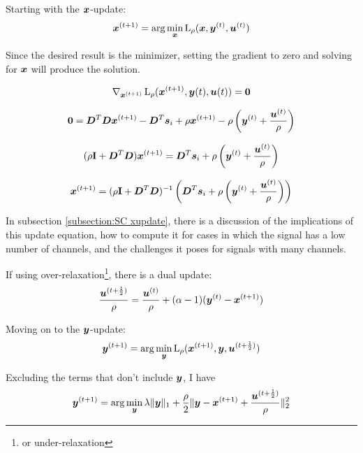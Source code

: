 Starting with the $\bm{x}$-update:
\begin{equation}
\bm{x}^{(t + 1)} = \arg\min_{\bm{x}} \operatorname{L}_{\rho}(\bm{x},\bm{y}^{(t)},\bm{u}^{(t)})
\end{equation}

Since the desired result is the minimizer, setting the gradient to zero and solving for $\bm{x}$ will produce the solution.

\begin{equation}
\nabla_{\bm{x}^{(t + 1)}} \operatorname{L}_{\rho}(\bm{x}^{(t + 1)},\bm{y}{(t)},\bm{u}{(t)}) = \bm{0}
\end{equation}

\begin{equation}
\bm{0} = \bm{D}^T\bm{D}\bm{x}^{(t + 1)} - \bm{D}^T\bm{s}_i + \rho\bm{x}^{(t + 1)} - \rho\left(\bm{y}^{(t)} + \frac{\bm{u}^{(t)}}{\rho}\right)
\end{equation}

\begin{equation}
(\rho{\bf I} + \bm{D}^T\bm{D})\bm{x}^{(t + 1)} = \bm{D}^T\bm{s}_i + \rho\left(\bm{y}^{(t)} + \frac{\bm{u}^{(t)}}{\rho}\right)
\end{equation}

\begin{equation}
\bm{x}^{(t + 1)} = (\rho{\bf I} + \bm{D}^T\bm{D})^{-1}\left(\bm{D}^T\bm{s}_i + \rho\left(\bm{y}^{(t)} + \frac{\bm{u}^{(t)}}{\rho}\right)\right)
\end{equation}

In subsection \ref{subsection:SC xupdate}, there is a discussion of the implications of this update equation, how to compute it for cases in which the signal has a low number of channels, and the challenges it poses for signals with many channels.

If using over-relaxation\footnote{or under-relaxation}, there is a dual update:
\begin{equation}
\frac{\bm{u}^{(t + \frac{1}{2})}}{\rho} = \frac{\bm{u}^{(t)}}{\rho} + (\alpha - 1)(\bm{y}^{(t)} - \bm{x}^{(t + 1)})
\end{equation}

Moving on to the $\bm{y}$-update:
\begin{equation}
\bm{y}^{(t + 1)} = \arg\min_{\bm{y}} \operatorname{L}_{\rho}(\bm{x}^{(t + 1)},\bm{y},\bm{u}^{(t + \frac{1}{2})})
\end{equation}

Excluding the terms that don't include $\bm{y}$, I have
\begin{equation}
\bm{y}^{(t + 1)} = \arg\min_{\bm{y}} \lambda\|\bm{y}\|_1 + \frac{\rho}{2}\|\bm{y} - \bm{x}^{(t + 1)} + \frac{\bm{u}^{(t + \frac{1}{2})}}{\rho}\|_2^2
\end{equation}

